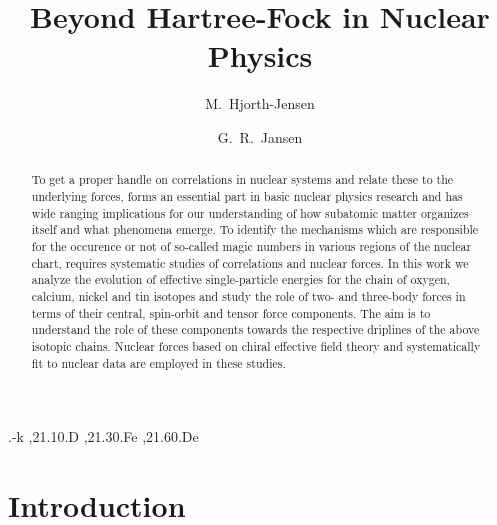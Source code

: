 \documentclass[preprint,12pt,authoryear]{elsarticle}
\begin{document}
\begin{frontmatter}
\title{Beyond Hartree-Fock in Nuclear Physics}
\author{M.~Hjorth-Jensen}
\address{National Superconducting Cyclotron Laboratory and Department of Physics and Astronomy, Michigan
  State University, East Lansing, MI 48824-1321, USA}
\address{Department of Physics, University of Oslo, N-0316 Oslo, Norway}
\author{G.~R.~Jansen}
\address{National Center for Computational Sciences and Physics Division,, Oak Ridge National Laboratory,
Oak Ridge, TN 37831, USA}

\begin{abstract}
To get a proper handle on correlations in nuclear systems and relate
these to the underlying forces, forms an essential part in basic
nuclear physics research and has wide ranging implications for our
understanding of how subatomic matter organizes itself and what
phenomena emerge. To identify the mechanisms which are
responsible for the occurence or not of so-called magic numbers in
various regions of the nuclear chart, requires systematic studies of
correlations and nuclear forces.
In this work we analyze the evolution of effective
   single-particle energies for the chain of oxygen, calcium, nickel
   and tin isotopes and study the role of two- and three-body forces
   in terms of their central, spin-orbit and tensor force components.
   The aim is to understand the role of these components towards the
   respective driplines of the above isotopic chains. Nuclear forces
   based on chiral effective field theory and systematically fit to
   nuclear data are employed in these studies.

\end{abstract}

\begin{keyword}
.-k \sep 21.10.D \sep 21.30.Fe \sep 21.60.De

\end{keyword}

\end{frontmatter}



\section{Introduction}\label{sec:intro}
\end{document}
